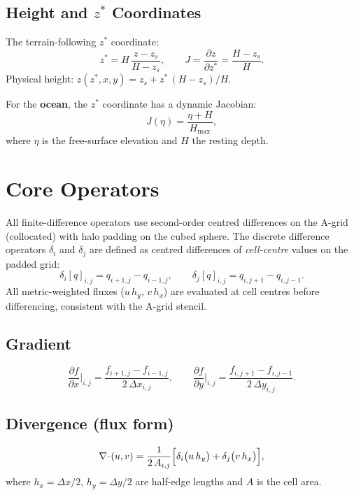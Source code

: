 \documentclass[11pt,a4paper]{article}
\newcommand{\pp}{\partial}
\begin{document}
\subsection{Height and $z^*$ Coordinates}

The terrain-following $z^*$ coordinate:
\begin{equation}
  z^* = H\,\frac{z-z_s}{H-z_s}, \qquad J=\frac{\pp z}{\pp z^*}=\frac{H-z_s}{H}.
\end{equation}
Physical height: $z(z^*,x,y)=z_s+z^*\,(H-z_s)/H$.

For the \textbf{ocean}, the $z^*$ coordinate has a dynamic Jacobian:
\begin{equation}
  J(\eta) = \frac{\eta+H}{H_{\max}},
\end{equation}
where $\eta$ is the free-surface elevation and $H$ the resting depth.

\section{Core Operators}

All finite-difference operators use second-order centred differences on the A-grid (collocated) with halo padding on the cubed sphere.  The discrete difference operators $\delta_i$ and $\delta_j$ are defined as centred differences of \emph{cell-centre} values on the padded grid:
\begin{equation}
  \delta_i[q]_{i,j} = q_{i+1,j}-q_{i-1,j}, \qquad \delta_j[q]_{i,j} = q_{i,j+1}-q_{i,j-1}.
\end{equation}
All metric-weighted fluxes ($u\,h_y$, $v\,h_x$) are evaluated at cell centres before differencing, consistent with the A-grid stencil.

\subsection{Gradient}
\begin{equation}
  \frac{\pp f}{\pp x}\bigg|_{i,j}=\frac{f_{i+1,j}-f_{i-1,j}}{2\,\Delta x_{i,j}},
  \qquad
  \frac{\pp f}{\pp y}\bigg|_{i,j}=\frac{f_{i,j+1}-f_{i,j-1}}{2\,\Delta y_{i,j}}.
\end{equation}

\subsection{Divergence (flux form)}
\begin{equation}
  \nabla\!\cdot\!(u,v) = \frac{1}{2\,A_{i,j}}
  \Bigl[\delta_i\bigl(u\,h_y\bigr)+\delta_j\bigl(v\,h_x\bigr)\Bigr],
\end{equation}
where $h_x=\Delta x/2$, $h_y=\Delta y/2$ are half-edge lengths and $A$ is the cell area.
\end{document}
